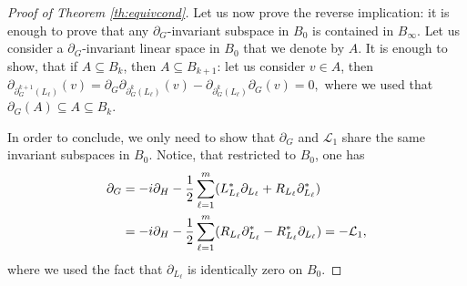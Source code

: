 \documentclass[preprint]{elsarticle}
\theoremstyle{definition}
\def\LL{\mathcal{L}}
\begin{document}
\begin{proof}[Proof of Theorem \ref{th:equivcond}]
Let us now prove the reverse implication: it is enough to prove that any $\partial_G$-invariant subspace in $B_0$ is contained in $B_\infty$. Let us consider a $\partial_G$-invariant linear space in $B_0$ that we denote by $A$. It is enough to show, that if $A \subseteq B_k$, then $A\subseteq B_{k+1}$: let us consider $v \in A$, then
$\partial_{\partial^{k+1}_G(L_\ell)}(v)=\partial_G\partial_{\partial^k_G(L_\ell)}(v)-\partial_{\partial^k_G(L_\ell)}\partial_G(v)=0,$
where we used that $\partial_G(A) \subseteq A \subseteq B_k$.

In order to conclude, we only need to show that $\partial_G$ and $\LL_1$ share the same invariant subspaces in $B_0$. Notice, that restricted to $B_0$, one has
\[\begin{split}
    \partial_G&=-i \partial_H-\frac{1}{2}\sum_{\ell=1}^{m}(L_{L_\ell}^*\partial_{L_\ell}+R_{L_\ell}\partial^*_{L_\ell})\\
    &=-i\partial_H-\frac{1}{2}\sum_{\ell=1}^{m}(R_{L_\ell}\partial_{L_\ell}^*-R_{L_\ell}^*\partial_{L_\ell})=-{\cal L}_1,
\end{split}\]
where we used the fact that $\partial_{L_\ell}$ is identically zero on $B_0$.


\end{proof}
\end{document}
